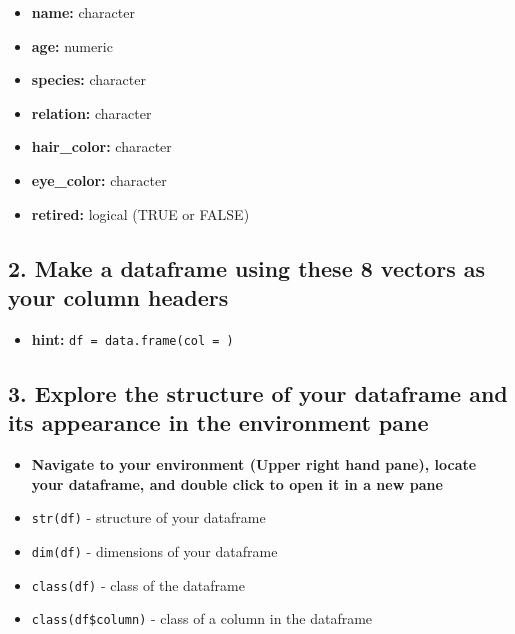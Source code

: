 \documentclass[
]{article}
\providecommand{\tightlist}{%
  \setlength{\itemsep}{0pt}\setlength{\parskip}{0pt}}
\begin{document}
\begin{itemize}
\tightlist
\item
  \textbf{name:} character
\item
  \textbf{age:} numeric
\item
  \textbf{species:} character
\item
  \textbf{relation:} character
\item
  \textbf{hair\_color:} character
\item
  \textbf{eye\_color:} character
\item
  \textbf{retired:} logical (TRUE or FALSE)
\end{itemize}

\hypertarget{make-a-dataframe-using-these-8-vectors-as-your-column-headers}{%
\subsection{\texorpdfstring{\textbf{2. Make a dataframe using these 8
vectors as your column
headers}}{2. Make a dataframe using these 8 vectors as your column headers}}\label{make-a-dataframe-using-these-8-vectors-as-your-column-headers}}

\begin{itemize}
\tightlist
\item
  \textbf{hint:} \texttt{df\ =\ data.frame(col\ =\ )} 
\end{itemize}

\hypertarget{explore-the-structure-of-your-dataframe-and-its-appearance-in-the-environment-pane}{%
\subsection{\texorpdfstring{\textbf{3. Explore the structure of your
dataframe and its appearance in the environment
pane}}{3. Explore the structure of your dataframe and its appearance in the environment pane}}\label{explore-the-structure-of-your-dataframe-and-its-appearance-in-the-environment-pane}}

\begin{itemize}
\tightlist
\item
  \textbf{Navigate to your environment (Upper right hand pane), locate
  your dataframe, and double click to open it in a new pane}
\item
  \texttt{str(df)} - structure of your dataframe
\item
  \texttt{dim(df)} - dimensions of your dataframe
\item
  \texttt{class(df)} - class of the dataframe
\item
  \texttt{class(df\$column)} - class of a column in the dataframe
\end{itemize}
\end{document}
